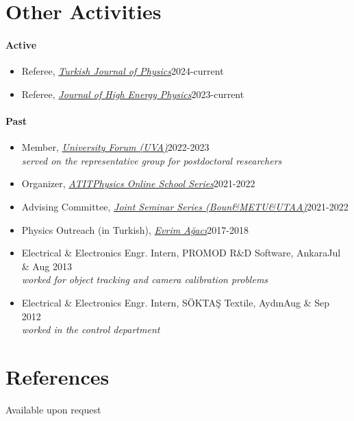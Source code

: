 \documentclass[a4paper,11pt]{article}
\begin{document}
\section{\textcolor{burntorange}{Other Activities}}
\paragraph{Active}
\begin{itemize}
    \item[] Referee, \emph{\hyperref{https://journals.tubitak.gov.tr/physics/}{}{}{Turkish Journal of Physics}}\hfill 2024-current\hspace*{2.2em}
	\item[] Referee, \emph{\hyperref{https://jhep.sissa.it/}{}{}{Journal of High Energy Physics}}\hfill 2023-current
\end{itemize}
\paragraph{Past}
\begin{itemize}
	\item[] Member, \emph{\hyperref{https://www.uva.nl/en/about-the-uva/policy-and-regulations/policy/university-forum/university-forum.html}{}{}{University Forum (UVA)}}\hfill 2022-2023\hspace*{2.2em}\\
	    \hspace*{1.8em}\emph{served on the representative group for postdoctoral researchers}
	\item[] Organizer, \emph{\hyperref{https://www.atitphysics.com}{}{}{ATITPhysics Online School Series}}\hfill 2021-2022\hspace*{2.2em}
	\item[] Advising Committee, \emph{\hyperref{https://sites.google.com/view/boun-metu-utaajointseminerseri/}{}{}{Joint Seminar Series (Boun\&METU\&UTAA)}}\hfill 2021-2022\hspace*{2.2em}
	\item[] Physics Outreach (in Turkish), \emph{\hyperref{https://youtube.com/playlist?list=PL48IwtBKtXrZcWuuJFpcflBkSqJv6YrW9}{}{}{Evrim Ağacı}}\hfill 2017-2018
	\item[] Electrical \& Electronics Engr. Intern, PROMOD R\&D Software, Ankara\hfill Jul \& Aug 2013\\	
	    \hspace*{1.8em}\emph{worked for object tracking and camera calibration problems}
	\item[] Electrical \& Electronics Engr. Intern, SÖKTAŞ Textile, Aydın\hfill Aug \& Sep 2012\\	
	    \hspace*{1.8em}\emph{worked in the control department}
\end{itemize}

\section{\textcolor{burntorange}{References}}
\hspace*{2em}Available upon request

\end{document}
